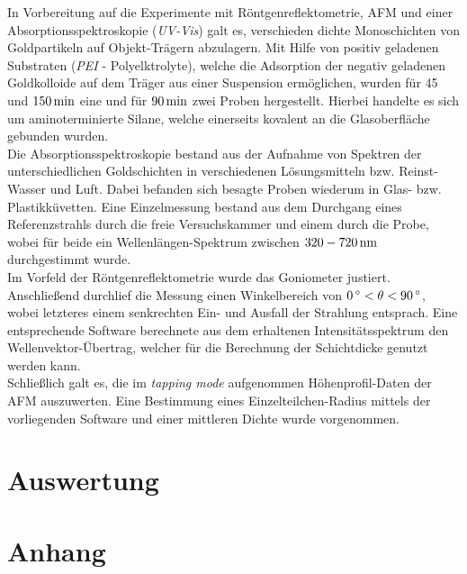 \documentclass[numbers=noenddot,a4paper,notitlepage,twoside,BCOR15mm]{scrartcl}
\newcommand{\degree}{^\circ}
\newcommand{\tilt}[1]{\textit{#1}}
\begin{document}
		In Vorbereitung auf die Experimente mit Röntgenreflektometrie, AFM und einer Absorptionsspektroskopie (\tilt{UV-Vis}) galt es, verschieden dichte Monoschichten von Goldpartikeln auf Objekt-Trägern abzulagern. Mit Hilfe von positiv geladenen Substraten  (\tilt{PEI} - Polyelktrolyte), welche die Adsorption der negativ geladenen Goldkolloide auf dem Träger aus einer Suspension ermöglichen, wurden für 45 und $\unit[150]{min}$ eine und für $\unit[90]{min}$ zwei Proben hergestellt. Hierbei handelte es sich um aminoterminierte Silane, welche einerseits kovalent an die Glasoberfläche gebunden wurden.\\
		Die Absorptionsspektroskopie bestand aus der Aufnahme von Spektren der unterschiedlichen Goldschichten in verschiedenen Lösungsmitteln bzw. Reinst-Wasser und Luft. Dabei befanden sich besagte Proben wiederum in Glas- bzw. Plastikküvetten. Eine Einzelmessung bestand aus dem Durchgang eines Referenzstrahls durch die freie Versuchskammer und einem durch die Probe, wobei für beide ein Wellenlängen-Spektrum zwischen $\unit[320-720]{nm}$ durchgestimmt wurde.\\
		Im Vorfeld der Röntgenreflektometrie wurde das Goniometer justiert. Anschließend durchlief die Messung einen Winkelbereich von $\unit[0]{\degree}<\theta<\unit[90]{\degree}$, wobei  letzteres einem senkrechten Ein- und Ausfall der Strahlung entsprach. Eine entsprechende Software berechnete aus dem erhaltenen Intensitätsspektrum den Wellenvektor-Übertrag, welcher für die Berechnung der Schichtdicke genutzt werden kann.\\
		Schließlich galt es, die im \tilt{tapping mode} aufgenommen Höhenprofil-Daten der AFM auszuwerten. Eine Bestimmung eines Einzelteilchen-Radius mittels der vorliegenden Software und einer mittleren Dichte wurde vorgenommen.

	\newpage
	\section{Auswertung}

		


	\newpage
	\section{Anhang}

		
		
\end{document}

